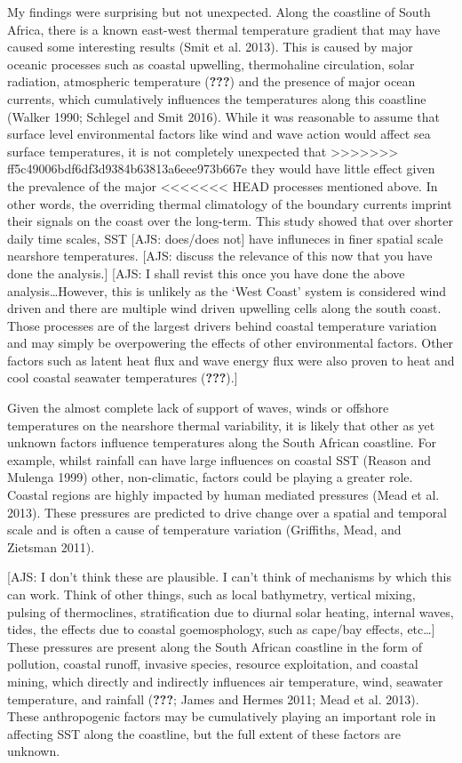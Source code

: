 \documentclass[12pt,A4paper,]{article}
\begin{document}
My findings were surprising but not unexpected. Along the coastline of
South Africa, there is a known east-west thermal temperature gradient
that may have caused some interesting results (Smit et al. 2013). This
is caused by major oceanic processes such as coastal upwelling,
thermohaline circulation, solar radiation, atmospheric temperature
({\textbf{???}}) and the presence of major ocean currents, which
cumulatively influences the temperatures along this coastline (Walker
1990; Schlegel and Smit 2016). While it was reasonable to assume that
surface level environmental factors like wind and wave action would
affect sea surface temperatures, it is not completely unexpected that
>>>>>>> ff5c49006bdf6df3d9384b63813a6eee973b667e
they would have little effect given the prevalence of the major
<<<<<<< HEAD
processes mentioned above. In other words, the overriding thermal
climatology of the boundary currents imprint their signals on the coast
over the long-term. This study showed that over shorter daily time
scales, SST {[}AJS: does/does not{]} have influneces in finer spatial
scale nearshore temperatures. {[}AJS: discuss the relevance of this now
that you have done the analysis.{]} {[}AJS: I shall revist this once you
have done the above analysis\ldots{}However, this is unlikely as the
`West Coast' system is considered wind driven and there are multiple
wind driven upwelling cells along the south coast. Those processes are
of the largest drivers behind coastal temperature variation and may
simply be overpowering the effects of other environmental factors. Other
factors such as latent heat flux and wave energy flux were also proven
to heat and cool coastal seawater temperatures ({\textbf{???}}).{]}

Given the almost complete lack of support of waves, winds or offshore
temperatures on the nearshore thermal variability, it is likely that
other as yet unknown factors influence temperatures along the South
African coastline. For example, whilst rainfall can have large
influences on coastal SST (Reason and Mulenga 1999) other, non-climatic,
factors could be playing a greater role. Coastal regions are highly
impacted by human mediated pressures (Mead et al. 2013). These pressures
are predicted to drive change over a spatial and temporal scale and is
often a cause of temperature variation (Griffiths, Mead, and Zietsman
2011).

{[}AJS: I don't think these are plausible. I can't think of mechanisms
by which this can work. Think of other things, such as local bathymetry,
vertical mixing, pulsing of thermoclines, stratification due to diurnal
solar heating, internal waves, tides, the effects due to coastal
goemosphology, such as cape/bay effects, etc\ldots{}{]} These pressures
are present along the South African coastline in the form of pollution,
coastal runoff, invasive species, resource exploitation, and coastal
mining, which directly and indirectly influences air temperature, wind,
seawater temperature, and rainfall ({\textbf{???}}; James and Hermes
2011; Mead et al. 2013). These anthropogenic factors may be cumulatively
playing an important role in affecting SST along the coastline, but the
full extent of these factors are unknown.
\end{document}
